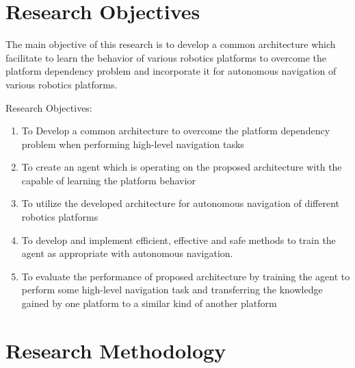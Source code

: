 \documentclass[a4paper,oneside,12pt]{report}
\begin{document}
\chapter{Research Objectives}
\label{ch:research objectives}

The main objective of this research is to develop a common architecture which facilitate to learn the behavior of various robotics platforms to overcome the platform dependency problem and incorporate it for autonomous navigation of various robotics platforms. 

Research Objectives:

\begin{enumerate}
\item To Develop a common architecture to overcome the platform dependency problem when performing high-level navigation tasks

\item To create an agent which is operating on the proposed architecture with the capable of learning the platform behavior 

\item To utilize the developed architecture for autonomous navigation of different robotics platforms 

\item To develop and implement efficient, effective and safe methods to train the agent as appropriate with autonomous navigation.  

\item To evaluate the performance of proposed architecture by training the agent to perform some high-level navigation task and transferring the knowledge gained by one platform to a similar kind of another platform 




\end{enumerate}


\chapter{Research Methodology}
\label{ch:research methodology}
\end{document}
